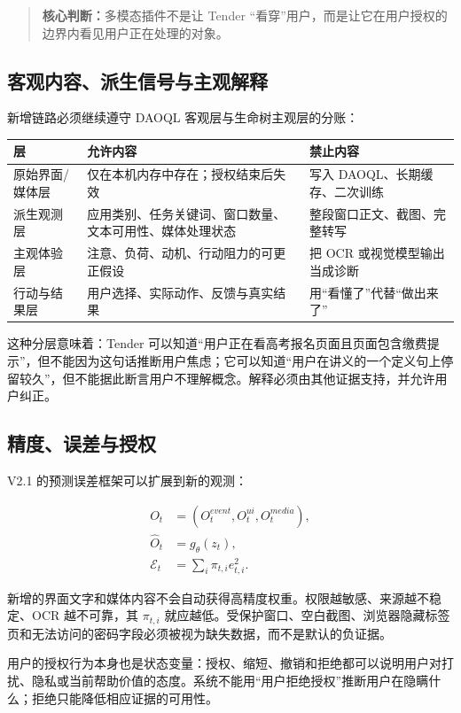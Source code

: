 \documentclass[UTF8,a4paper,11pt]{ctexart}
\newcommand{\keypoint}[1]{\begin{quote}\noindent\textbf{\color{TenderBlue}核心判断：}#1\end{quote}}
\begin{document}
\keypoint{多模态插件不是让 Tender “看穿”用户，而是让它在用户授权的边界内看见用户正在处理的对象。}

\subsection{客观内容、派生信号与主观解释}

新增链路必须继续遵守 DAOQL 客观层与生命树主观层的分账：

\begin{center}
\begin{longtable}{@{}p{3.2cm}p{5.0cm}p{5.2cm}@{}}
\toprule
\textbf{层} & \textbf{允许内容} & \textbf{禁止内容} \\
\midrule
原始界面/媒体层 & 仅在本机内存中存在；授权结束后失效 & 写入 DAOQL、长期缓存、二次训练 \\
派生观测层 & 应用类别、任务关键词、窗口数量、文本可用性、媒体处理状态 & 整段窗口正文、截图、完整转写 \\
主观体验层 & 注意、负荷、动机、行动阻力的可更正假设 & 把 OCR 或视觉模型输出当成诊断 \\
行动与结果层 & 用户选择、实际动作、反馈与真实结果 & 用“看懂了”代替“做出来了” \\
\bottomrule
\end{longtable}
\end{center}

这种分层意味着：Tender 可以知道“用户正在看高考报名页面且页面包含缴费提示”，但不能因为这句话推断用户焦虑；它可以知道“用户在讲义的一个定义句上停留较久”，但不能据此断言用户不理解概念。解释必须由其他证据支持，并允许用户纠正。

\subsection{精度、误差与授权}

V2.1 的预测误差框架可以扩展到新的观测：

\begin{align}
O_t &= (O_t^{event}, O_t^{ui}, O_t^{media}),\\
\hat O_t &= g_\theta(z_t),\\
\mathcal E_t &= \sum_i \pi_{t,i} e_{t,i}^{2}.
\end{align}

新增的界面文字和媒体内容不会自动获得高精度权重。权限越敏感、来源越不稳定、OCR 越不可靠，其 $\pi_{t,i}$ 就应越低。受保护窗口、空白截图、浏览器隐藏标签页和无法访问的密码字段必须被视为缺失数据，而不是默认的负证据。

用户的授权行为本身也是状态变量：授权、缩短、撤销和拒绝都可以说明用户对打扰、隐私或当前帮助价值的态度。系统不能用“用户拒绝授权”推断用户在隐瞒什么；拒绝只能降低相应证据的可用性。
\end{document}
